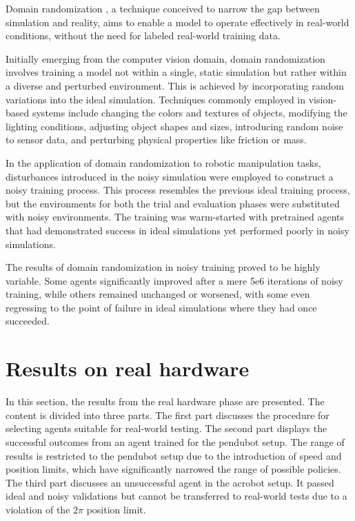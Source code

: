 Domain randomization \cite{tobin2017domain}, a technique conceived to narrow the gap between simulation and reality, aims to enable a model to operate effectively in real-world conditions, without the need for labeled real-world training data.

Initially emerging from the computer vision domain, domain randomization involves training a model not within a single, static simulation but rather within a diverse and perturbed environment. This is achieved by incorporating random variations into the ideal simulation. Techniques commonly employed in vision-based systems include changing the colors and textures of objects, modifying the lighting conditions, adjusting object shapes and sizes, introducing random noise to sensor data, and perturbing physical properties like friction or mass.

In the application of domain randomization to robotic manipulation tasks, disturbances introduced in the noisy simulation were employed to construct a noisy training process. This process resembles the previous ideal training process, but the environments for both the trial and evaluation phases were substituted with noisy environments. The training was warm-started with pretrained agents that had demonstrated success in ideal simulations yet performed poorly in noisy simulations.

The results of domain randomization in noisy training proved to be highly variable. Some agents significantly improved after a mere 5e6 iterations of noisy training, while others remained unchanged or worsened, with some even regressing to the point of failure in ideal simulations where they had once succeeded.


\section{Results on real hardware}
In this section, the results from the real hardware phase are presented. The content is divided into three parts. The first part discusses the procedure for selecting agents suitable for real-world testing. The second part displays the successful outcomes from an agent trained for the pendubot setup. The range of results is restricted to the pendubot setup due to the introduction of speed and position limits, which have significantly narrowed the range of possible policies. The third part discusses an unsuccessful agent in the acrobot setup. It passed ideal and noisy validations but cannot be transferred to real-world tests due to a violation of the \(2\pi\) position limit.

